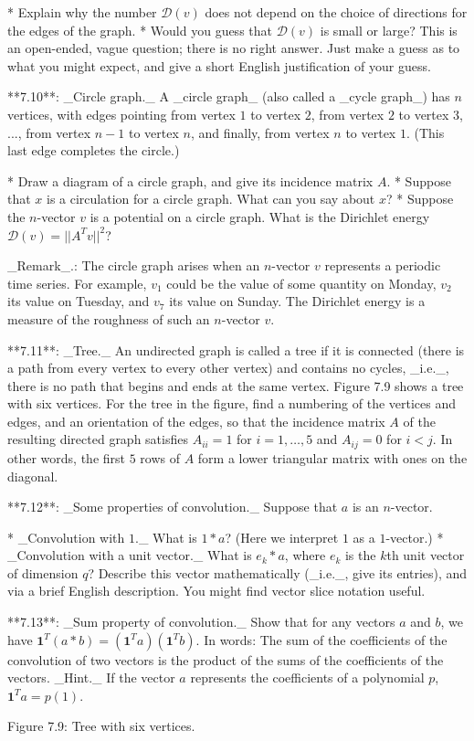 * Explain why the number \(\mathcal{D}(v)\) does not depend on the choice of directions for the edges of the graph.
* Would you guess that \(\mathcal{D}(v)\) is small or large? This is an open-ended, vague question; there is no right answer. Just make a guess as to what you might expect, and give a short English justification of your guess.

**7.10**: _Circle graph._ A _circle graph_ (also called a _cycle graph_) has \(n\) vertices, with edges pointing from vertex \(1\) to vertex \(2\), from vertex \(2\) to vertex \(3\), ..., from vertex \(n-1\) to vertex \(n\), and finally, from vertex \(n\) to vertex \(1\). (This last edge completes the circle.)

* Draw a diagram of a circle graph, and give its incidence matrix \(A\).
* Suppose that \(x\) is a circulation for a circle graph. What can you say about \(x\)?
* Suppose the \(n\)-vector \(v\) is a potential on a circle graph. What is the Dirichlet energy \(\mathcal{D}(v)=||A^{T}v||^{2}\)?

_Remark_.: The circle graph arises when an \(n\)-vector \(v\) represents a periodic time series. For example, \(v_{1}\) could be the value of some quantity on Monday, \(v_{2}\) its value on Tuesday, and \(v_{7}\) its value on Sunday. The Dirichlet energy is a measure of the roughness of such an \(n\)-vector \(v\).

**7.11**: _Tree._ An undirected graph is called a tree if it is connected (there is a path from every vertex to every other vertex) and contains no cycles, _i.e._, there is no path that begins and ends at the same vertex. Figure 7.9 shows a tree with six vertices. For the tree in the figure, find a numbering of the vertices and edges, and an orientation of the edges, so that the incidence matrix \(A\) of the resulting directed graph satisfies \(A_{ii}=1\) for \(i=1,\ldots,5\) and \(A_{ij}=0\) for \(i<j\). In other words, the first \(5\) rows of \(A\) form a lower triangular matrix with ones on the diagonal.

**7.12**: _Some properties of convolution._ Suppose that \(a\) is an \(n\)-vector.

* _Convolution with \(1\)._ What is \(1*a\)? (Here we interpret \(1\) as a \(1\)-vector.)
* _Convolution with a unit vector._ What is \(e_{k}*a\), where \(e_{k}\) is the \(k\)th unit vector of dimension \(q\)? Describe this vector mathematically (_i.e._, give its entries), and via a brief English description. You might find vector slice notation useful.

**7.13**: _Sum property of convolution._ Show that for any vectors \(a\) and \(b\), we have \(\mathbf{1}^{T}(a*b)=(\mathbf{1}^{T}a)(\mathbf{1}^{T}b)\). In words: The sum of the coefficients of the convolution of two vectors is the product of the sums of the coefficients of the vectors. _Hint._ If the vector \(a\) represents the coefficients of a polynomial \(p\), \(\mathbf{1}^{T}a=p(1)\).

Figure 7.9: Tree with six vertices.

 
